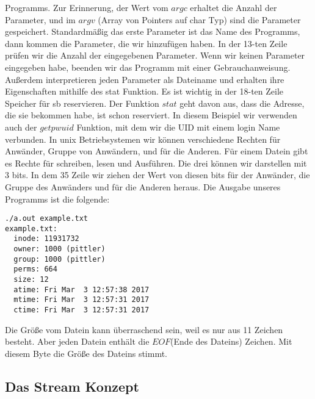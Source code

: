 \documentclass{article}[12pt]
\begin{document}
Programms. Zur Erinnerung, der Wert vom $argc$ erhaltet die Anzahl der Parameter, und im $argv$ (Array von Pointers auf
char Typ) sind die Parameter gespeichert. Standardmäßig das erste Parameter ist das Name des Programms, dann kommen
die Parameter, die wir hinzufügen haben. In der 13-ten Zeile prüfen wir die Anzahl der eingegebenen Parameter. Wenn
wir keinen Parameter eingegeben habe, beenden wir das Programm mit einer Gebrauchanweisung. Außerdem interpretieren 
jeden Parameter als Dateiname und erhalten ihre Eigenschaften mithilfe des stat Funktion. Es ist wichtig in der 18-ten
Zeile Speicher für sb reservieren. Der Funktion $stat$ geht davon aus, dass die Adresse, die sie bekommen habe, ist
schon reserviert. In diesem Beispiel wir verwenden auch der $getpwuid$ Funktion, mit dem wir die UID mit einem login 
Name verbunden. In unix Betriebsystemen wir können verschiedene Rechten für Anwänder, Gruppe von Anwändern, und für die
Anderen. Für einem Datein gibt es Rechte für schreiben, lesen und Ausführen. Die drei können wir darstellen mit 3 bits.
In dem 35 Zeile wir ziehen der Wert von diesen bits für der Anwänder, die Gruppe des Anwänders und für die Anderen heraus.
Die Ausgabe unseres Programms ist die folgende:
\begin{lstlisting}
./a.out example.txt
example.txt:
  inode: 11931732
  owner: 1000 (pittler)
  group: 1000 (pittler)
  perms: 664
  size: 12
  atime: Fri Mar  3 12:57:38 2017
  mtime: Fri Mar  3 12:57:31 2017
  ctime: Fri Mar  3 12:57:31 2017
\end{lstlisting}
Die Größe vom Datein kann überraschend sein, weil es nur aus 11 Zeichen besteht. Aber jeden Datein enthält die 
$EOF$(Ende des Dateins) Zeichen. Mit diesem Byte die Größe des Dateins stimmt.
\subsection{Das Stream Konzept}
\end{document}
